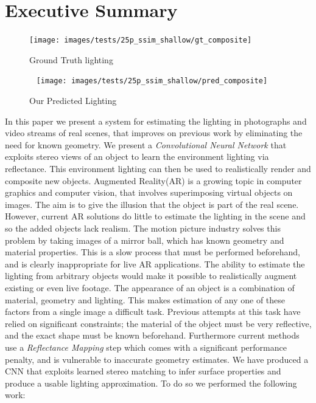 \documentclass[ %
                    author={Gavin Parker},
                supervisor={Dr. Neill Campbell},
                    degree={MEng},
                     title={Deep Learning for Illumination Estimation from Stereo Images},
                  subtitle={},
                      type={Research},
                      year={2018} ]{dissertation}
\begin{document}
\chapter*{Executive Summary}
\begin{figure}[H]
\centering
{}
	\texttt{[image: images/tests/25p\_ssim\_shallow/gt\_composite]}
	\caption{Ground Truth lighting}
\endminipage\
	\texttt{[image: images/tests/25p\_ssim\_shallow/pred\_composite]}
	\caption{Our Predicted Lighting}
\endminipage
\label{example_1}
\end{figure}
\noindent
In this paper we present a system for estimating the lighting in photographs and video streams of real scenes, that improves on previous work by eliminating the need for known geometry. We present a \textit{Convolutional Neural Network} that exploits stereo views of an object to learn the environment lighting via reflectance. This environment lighting can then be used to realistically render and composite new objects.
\newline
Augmented Reality(AR) is a growing topic in computer graphics and computer vision, that involves superimposing virtual objects on images. The aim is to give the illusion that the object is part of the real scene. However, current AR solutions do little to estimate the lighting in the scene and so the added objects lack realism. The motion picture industry solves this problem by taking images of a mirror ball, which has known geometry and material properties. This is a slow process that must be performed beforehand, and is clearly inappropriate for live AR applications. The ability to estimate the lighting from arbitrary objects would make it possible to realistically augment existing or even live footage.
\newline
The appearance of an object is a combination of material, geometry and lighting. This makes estimation of any one of these factors from a single image a difficult task. Previous attempts at this task have relied on significant constraints; the material of the object must be very reflective, and the exact shape must be known beforehand. Furthermore current methods use a \textit{Reflectance Mapping} step which comes with a significant performance penalty, and is vulnerable to inaccurate geometry estimates. We have produced a CNN that exploits learned stereo matching to infer surface properties and produce a usable lighting approximation. To do so we performed the following work:
\end{document}
